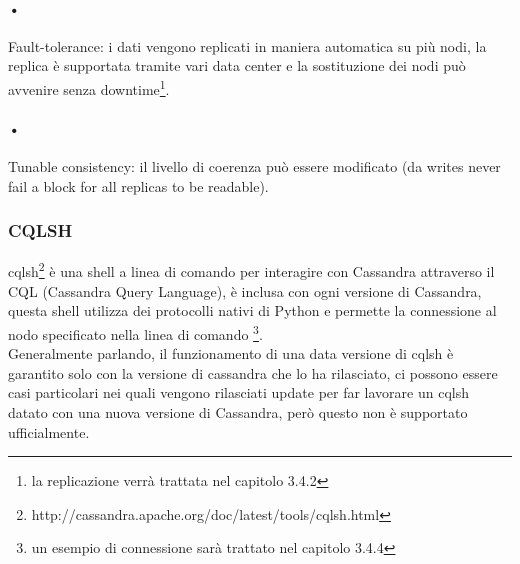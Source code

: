 \paragraph{•} Fault-tolerance: i dati vengono replicati in maniera automatica su più nodi, la replica è supportata tramite vari data center e la sostituzione dei nodi può avvenire senza downtime\footnote{la replicazione verrà trattata nel capitolo 3.4.2}.
\paragraph{•} Tunable consistency: il livello di coerenza può essere modificato (da writes never fail a block for all replicas to be readable).
\subsubsection{CQLSH}
\hspace{\parindent}cqlsh\footnote{http://cassandra.apache.org/doc/latest/tools/cqlsh.html} è una shell a linea di comando per interagire con Cassandra attraverso il CQL (Cassandra Query Language), è inclusa con ogni versione di Cassandra, questa shell utilizza dei protocolli nativi di Python e permette la connessione al nodo specificato nella linea di comando \footnote{un esempio di connessione sarà trattato nel capitolo 3.4.4}.
\\Generalmente parlando, il funzionamento di una data versione di cqlsh  è garantito solo con la versione di cassandra che lo ha rilasciato, ci possono essere casi particolari nei quali vengono rilasciati update per far lavorare un cqlsh datato con una nuova versione di Cassandra, però questo non è supportato ufficialmente.